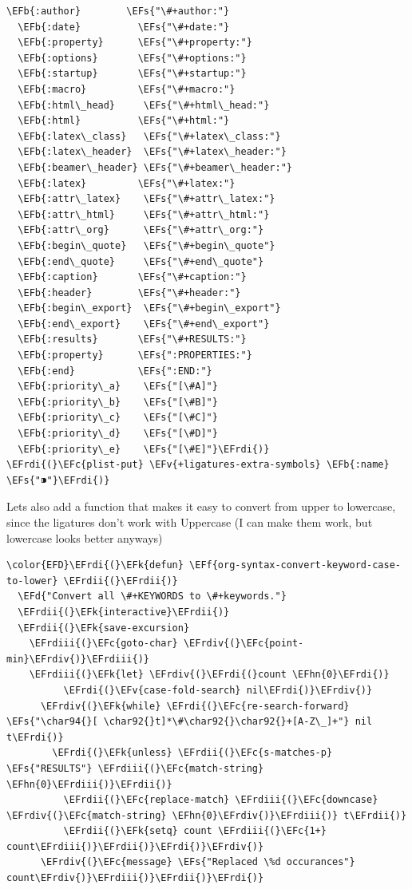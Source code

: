 \documentclass{scrartcl}
\newcommand{\EFk}[1]{\textcolor{EFk}{#1}} %
\newcommand{\EFd}[1]{\textcolor{EFd}{#1}} %
\newcommand{\EFs}[1]{\textcolor{EFs}{#1}} %
\newcommand{\EFb}[1]{\textcolor{EFb}{#1}} %
\newcommand{\EFc}[1]{\textcolor{EFc}{#1}} %
\newcommand{\EFv}[1]{\textcolor{EFv}{#1}} %
\newcommand{\EFf}[1]{\textcolor{EFf}{#1}} %
\newcommand{\EFhn}[1]{#1} %
\newcommand{\EFrdi}[1]{#1} %
\newcommand{\EFrdii}[1]{#1} %
\newcommand{\EFrdiii}[1]{#1} %
\newcommand{\EFrdiv}[1]{#1} %
\begin{document}
\begin{Code}
\begin{Verbatim}[]
  \EFb{:author}        \EFs{"\#+author:"}
  \EFb{:date}          \EFs{"\#+date:"}
  \EFb{:property}      \EFs{"\#+property:"}
  \EFb{:options}       \EFs{"\#+options:"}
  \EFb{:startup}       \EFs{"\#+startup:"}
  \EFb{:macro}         \EFs{"\#+macro:"}
  \EFb{:html\_head}     \EFs{"\#+html\_head:"}
  \EFb{:html}          \EFs{"\#+html:"}
  \EFb{:latex\_class}   \EFs{"\#+latex\_class:"}
  \EFb{:latex\_header}  \EFs{"\#+latex\_header:"}
  \EFb{:beamer\_header} \EFs{"\#+beamer\_header:"}
  \EFb{:latex}         \EFs{"\#+latex:"}
  \EFb{:attr\_latex}    \EFs{"\#+attr\_latex:"}
  \EFb{:attr\_html}     \EFs{"\#+attr\_html:"}
  \EFb{:attr\_org}      \EFs{"\#+attr\_org:"}
  \EFb{:begin\_quote}   \EFs{"\#+begin\_quote"}
  \EFb{:end\_quote}     \EFs{"\#+end\_quote"}
  \EFb{:caption}       \EFs{"\#+caption:"}
  \EFb{:header}        \EFs{"\#+header:"}
  \EFb{:begin\_export}  \EFs{"\#+begin\_export"}
  \EFb{:end\_export}    \EFs{"\#+end\_export"}
  \EFb{:results}       \EFs{"\#+RESULTS:"}
  \EFb{:property}      \EFs{":PROPERTIES:"}
  \EFb{:end}           \EFs{":END:"}
  \EFb{:priority\_a}    \EFs{"[\#A]"}
  \EFb{:priority\_b}    \EFs{"[\#B]"}
  \EFb{:priority\_c}    \EFs{"[\#C]"}
  \EFb{:priority\_d}    \EFs{"[\#D]"}
  \EFb{:priority\_e}    \EFs{"[\#E]"}\EFrdi{)}
\EFrdi{(}\EFc{plist-put} \EFv{+ligatures-extra-symbols} \EFb{:name} \EFs{"⁍"}\EFrdi{)}
\end{Verbatim}
\end{Code}

Lets also add a function that makes it easy to convert from upper to lowercase,
since the ligatures don't work with Uppercase (I can make them work, but
lowercase looks better anyways)
\begin{Code}
\begin{Verbatim}[]
\color{EFD}\EFrdi{(}\EFk{defun} \EFf{org-syntax-convert-keyword-case-to-lower} \EFrdii{(}\EFrdii{)}
  \EFd{"Convert all \#+KEYWORDS to \#+keywords."}
  \EFrdii{(}\EFk{interactive}\EFrdii{)}
  \EFrdii{(}\EFk{save-excursion}
    \EFrdiii{(}\EFc{goto-char} \EFrdiv{(}\EFc{point-min}\EFrdiv{)}\EFrdiii{)}
    \EFrdiii{(}\EFk{let} \EFrdiv{(}\EFrdi{(}count \EFhn{0}\EFrdi{)}
          \EFrdi{(}\EFv{case-fold-search} nil\EFrdi{)}\EFrdiv{)}
      \EFrdiv{(}\EFk{while} \EFrdi{(}\EFc{re-search-forward} \EFs{"\char94{}[ \char92{}t]*\#\char92{}\char92{}+[A-Z\_]+"} nil t\EFrdi{)}
        \EFrdi{(}\EFk{unless} \EFrdii{(}\EFc{s-matches-p} \EFs{"RESULTS"} \EFrdiii{(}\EFc{match-string} \EFhn{0}\EFrdiii{)}\EFrdii{)}
          \EFrdii{(}\EFc{replace-match} \EFrdiii{(}\EFc{downcase} \EFrdiv{(}\EFc{match-string} \EFhn{0}\EFrdiv{)}\EFrdiii{)} t\EFrdii{)}
          \EFrdii{(}\EFk{setq} count \EFrdiii{(}\EFc{1+} count\EFrdiii{)}\EFrdii{)}\EFrdi{)}\EFrdiv{)}
      \EFrdiv{(}\EFc{message} \EFs{"Replaced \%d occurances"} count\EFrdiv{)}\EFrdiii{)}\EFrdii{)}\EFrdi{)}
\end{Verbatim}
\end{Code}
\end{document}

